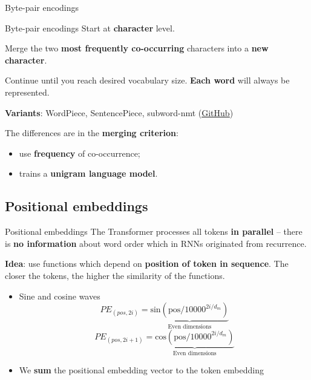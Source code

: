 \documentclass[12pt,aspectratio=169,handout]{beamer}
\begin{document}
\begin{frame}{Byte-pair encodings}

	\begin{block}{Byte-pair encodings}
		Start at \textbf{character} level. 
		
		Merge the two \textbf{most frequently co-occurring} characters into a \textbf{new character}. 
		
		Continue until you reach desired vocabulary size.
		\textbf{Each word} will always be represented.

	\end{block}

	\pause

	\textbf{Variants}: WordPiece, SentencePiece, subword-nmt (\href{https://github.com/google/sentencepiece}{\underline{GitHub}})

	\pause

	The differences are in the \textbf{merging criterion}:
	\pause
	\begin{itemize}
		\item \cite{Sennrich.et.al.2016.ACL} use \textbf{frequency} of co-occurrence;
		\item \cite{kudo2018subword} trains a \textbf{unigram language model}.
	\end{itemize}

\end{frame}

\subsection{Positional embeddings}

\begin{frame}{Positional embeddings}
	The Transformer processes all tokens \textbf{in parallel} -- there is \textbf{no information} about word order which in RNNs originated from recurrence. 

	\pause

	\textbf{Idea}: use functions which depend on \textbf{position of token in sequence}. The closer the tokens, the higher the similarity of the functions.
	
	\pause

	\begin{itemize}
		\item Sine and cosine waves
		$$
			PE_{(pos, 2i)} = \underbrace{\text{sin} ( \text{pos} / 10000^{2i / d_m})}_{\text{Even dimensions}}
		$$
		\pause
		$$
			PE_{(pos, 2i+1)} = \underbrace{\text{cos} ( \text{pos} / 10000^{2i / d_m})}_{\text{Even dimensions}}
		$$
		\pause
		\item We \textbf{sum} the positional embedding vector to the token embedding
	\end{itemize}

\end{frame}
\end{document}
